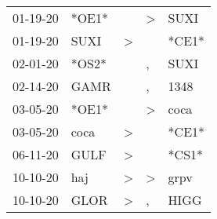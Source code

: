 \begin{supertabular}{p{0.07\textwidth}p{0.06\textwidth}p{0.02\textwidth}p{0.02\textwidth}p{0.06\textwidth}}
          01-19-20\textsuperscript{} &                            *OE1* &                  &     \textgreater &           SUXI\textsuperscript{} \\
          01-19-20\textsuperscript{} &           SUXI\textsuperscript{} &     \textgreater &                  &                            *CE1* \\
          02-01-20\textsuperscript{} &                            *OS2* &                  &                , &           SUXI\textsuperscript{} \\
          02-14-20\textsuperscript{} &           GAMR\textsuperscript{} &                  &                , &           1348\textsuperscript{} \\
          03-05-20\textsuperscript{} &                            *OE1* &                  &     \textgreater &           coca\textsuperscript{} \\
          03-05-20\textsuperscript{} &           coca\textsuperscript{} &     \textgreater &                  &                            *CE1* \\
          06-11-20\textsuperscript{} &           GULF\textsuperscript{} &     \textgreater &                  &                            *CS1* \\
          10-10-20\textsuperscript{} &            haj\textsuperscript{} &     \textgreater &     \textgreater &           grpv\textsuperscript{} \\
          10-10-20\textsuperscript{} &           GLOR\textsuperscript{} &     \textgreater &                , &           HIGG\textsuperscript{} \\
\end{supertabular}

